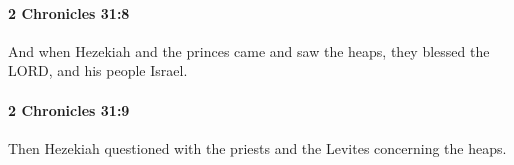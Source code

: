 		\paragraph{2 Chronicles 31:8} %
			\label{2CHRONICLES-31-8}

			And when Hezekiah and the princes came and saw the heaps, they blessed the LORD, and his people Israel.


		\paragraph{2 Chronicles 31:9} %
			\label{2CHRONICLES-31-9}

			Then Hezekiah questioned with the priests and the Levites concerning the heaps.



